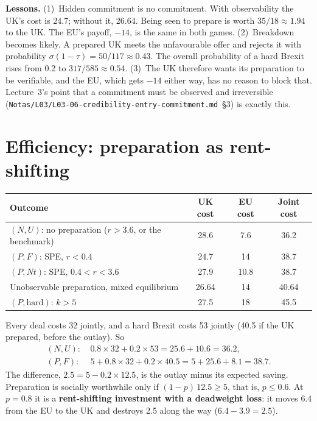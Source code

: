 \documentclass[11pt,a4paper]{article}
\newcommand{\Nt}{\mathit{Nt}}
\newcommand{\dF}{\mathit{F}}
\newcommand{\dU}{\mathit{U}}
\begin{document}
\textbf{Lessons.} (1)~Hidden commitment is no commitment. With observability the UK's cost is
24.7; without it, 26.64. Being seen to prepare is worth $35/18\approx1.94$ to the UK. The EU's
payoff, $-14$, is the same in both games. (2)~Breakdown becomes likely. A prepared UK meets the
unfavourable offer and rejects it with probability $\sigma(1-\tau)=50/117\approx0.43$. The
overall probability of a hard Brexit rises from 0.2 to $317/585\approx0.54$. (3)~The UK
therefore wants its preparation to be verifiable, and the EU, which gets $-14$ either way, has no
reason to block that. Lecture~3's point that a commitment must be observed and irreversible
(\texttt{Notas/L03/L03-06-credibility-entry-commitment.md}~\S3) is exactly this.

\section{Efficiency: preparation as rent-shifting}

\begin{center}
\begin{tabular}{lccc}
\toprule
Outcome & UK cost & EU cost & Joint cost \\
\midrule
$(N,\dU)$: no preparation ($r>3.6$, or the benchmark) & 28.6 & 7.6 & 36.2 \\
$(P,\dF)$: SPE, $r<0.4$ & 24.7 & 14 & 38.7 \\
$(P,\Nt)$: SPE, $0.4<r<3.6$ & 27.9 & 10.8 & 38.7 \\
Unobservable preparation, mixed equilibrium & 26.64 & 14 & 40.64 \\
$(P,\text{hard})$: $k>5$ & 27.5 & 18 & 45.5 \\
\bottomrule
\end{tabular}
\end{center}

Every deal costs 32 jointly, and a hard Brexit costs 53 jointly (40.5 if the UK prepared, before the
outlay). So
\begin{align*}
  (N,\dU):&\ 0.8\times32+0.2\times53=25.6+10.6=36.2,\\
  (P,\dF):&\ 5+0.8\times32+0.2\times40.5=5+25.6+8.1=38.7 .
\end{align*}
The difference, $2.5=5-0.2\times12.5$, is the outlay minus its expected saving. Preparation is
socially worthwhile only if $(1-p)\,12.5\ge5$, that is, $p\le0.6$. At $p=0.8$ it is a
\textbf{rent-shifting investment with a deadweight loss}: it moves 6.4 from the EU to the UK and
destroys 2.5 along the way ($6.4-3.9=2.5$).
\end{document}
